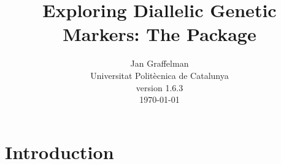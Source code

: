 \documentclass[nojss]{jss}
\author{Jan Graffelman\\Universitat Polit\`ecnica de Catalunya\\version 1.6.3\\ \today}
\title{Exploring Diallelic Genetic Markers: The \pkg{HardyWeinberg} Package}
\begin{document}
\newcommand{\bx}{\ensuremath{\mathbf x}}
\newcommand{\pval}{$p$~value}
\newcommand{\pvals}{$p$~values}

\newcommand{\norm}[1]{\parallel\! #1 \!\parallel}
\newcommand{\deter}[1]{\mid\! #1 \!\mid}
\newcommand{\diag}[1]{\mbox{diag}(#1)}
\newcommand{\inv}[1]{{(#1)}^{-1}}
\newcommand{\invnp}[1]{{#1}^{-1}}
\newcommand{\chisq}{$\chi^2$}
\newcommand{\half}{\ensuremath{\frac{1}{2}}}
\newcommand{\abs}[1]{{|#1|}}
\newcommand{\etal}{{\it et al.}}
\newcommand{\sumn}{\sum_{i=1}^n}
\newcommand{\summ}{\sum_{i=1}^m}
\newcommand{\sumk}{\sum_{k=1}^n}
\newcommand{\sumxinf}{\sum_{x=1}^\infty}
\newcommand{\sumyinf}{\sum_{y=1}^\infty}
\newcommand{\Pro}[1]{P \left( #1 \right)}
\newcommand{\recip}[1]{\frac{1}{ #1 }}
\newcommand{\lne}[1]{\ln \left( #1 \right)}
\newcommand{\naa}{\ensuremath{n_{AA}}}
\newcommand{\nab}{\ensuremath{n_{AB}}}
\newcommand{\nbb}{\ensuremath{n_{BB}}}
\newcommand{\na}{\ensuremath{n_{A}}}
\newcommand{\nb}{\ensuremath{n_{B}}}
\newcommand{\eaa}{\ensuremath{e_{AA}}}
\newcommand{\eab}{\ensuremath{e_{AB}}}
\newcommand{\ebb}{\ensuremath{e_{BB}}}
\newcommand{\faa}{\ensuremath{f_{AA}}}
\newcommand{\fab}{\ensuremath{f_{AB}}}
\newcommand{\fbb}{\ensuremath{f_{BB}}}
\newcommand{\hfaa}{\ensuremath{\hat{f}_{AA}}}
\newcommand{\hfab}{\ensuremath{\hat{f}_{AB}}}
\newcommand{\hfbb}{\ensuremath{\hat{f}_{BB}}}
\newcommand{\faai}{\ensuremath{f_{AA_i}}}
\newcommand{\fabi}{\ensuremath{f_{AB_i}}}
\newcommand{\fbbi}{\ensuremath{f_{BB_i}}}
\newcommand{\naai}{\ensuremath{n_{AA_i}}}
\newcommand{\nabi}{\ensuremath{n_{AB_i}}}
\newcommand{\nbbi}{\ensuremath{n_{BB_i}}}
\newcommand{\midp}{mid}
\newcommand{\dos}{DOST}
\newcommand{\sel}{SELOME}
\newcommand\Real{ {\mathbb{R}} }        %
\newcommand{\gm}{ {\mathrm{g_m}} }      %
\newcommand{\mbf}{ \mathbf }            %
\newcommand{\mbfg}{ \boldsymbol }       %
\newcommand{\clr}{ \mathrm{clr} }       %
\newcommand{\alr}{ \mathrm{alr} }       %
\newcommand{\ilr}{ \mathrm{ilr} }       %

\section{Introduction}
\end{document}
